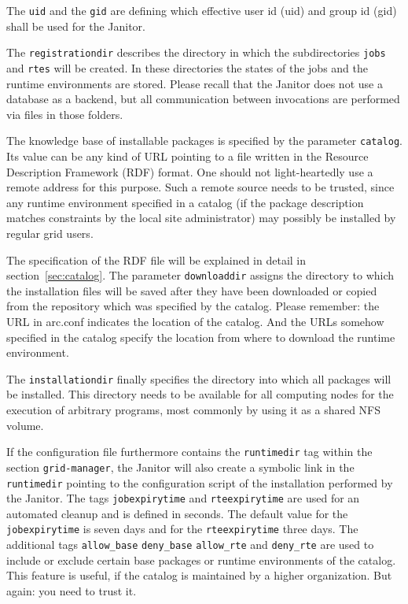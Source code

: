 The \texttt{uid} and the \texttt{gid} are defining which effective user id
(uid) and group id (gid) shall be used for the Janitor.

The \texttt{registrationdir} describes the directory in which the
subdirectories \texttt{jobs} and \texttt{rtes} will be created.
In these directories the states of the jobs and the runtime environments
are stored. Please recall that the Janitor does not use a database as
a backend, but all communication between invocations are performed via
files in those folders.

The knowledge base of installable packages is specified by the parameter
\texttt{catalog}.  Its value can be any kind of URL pointing to a file
written in the Resource Description Framework (RDF) format.  One should
not light-heartedly use a remote address for this purpose. Such a remote
source needs to be trusted, since any runtime environment specified in
a catalog (if the package description matches constraints by the local
site administrator) may possibly be installed by regular grid users.

The specification of the RDF file will be explained in detail in
section~\ref{sec:catalog}.  The parameter \texttt{downloaddir} assigns
the directory to which the installation files will be saved after they
have been downloaded or copied from the repository which was specified by
the catalog. Please remember: the URL in arc.conf indicates the location
of the catalog. And the URLs somehow specified in the catalog specify
the location from where to download the runtime environment.

The \texttt{installationdir} finally specifies the directory into which
all packages will be installed. This directory needs to be available
for all computing nodes for the execution of arbitrary programs, most
commonly by using it as a shared NFS volume.

If the configuration file furthermore contains the \texttt{runtimedir}
tag within the section \texttt{grid-manager}, the Janitor will also
create a symbolic link in the \texttt{runtimedir} pointing to the
configuration script of the installation performed by the Janitor.
The tags \texttt{jobexpirytime} and \texttt{rteexpirytime} are used
for an automated cleanup and is defined in seconds.  The default
value for the \texttt{jobexpirytime} is seven days and for
the \texttt{rteexpirytime} three days.  The additional tags
\texttt{allow\_base} \texttt{deny\_base} \texttt{allow\_rte} and
\texttt{deny\_rte} are used to include or exclude certain base packages
or runtime environments of the catalog. This feature is useful, if the
catalog is maintained by a higher organization. But again: you need to
trust it.

